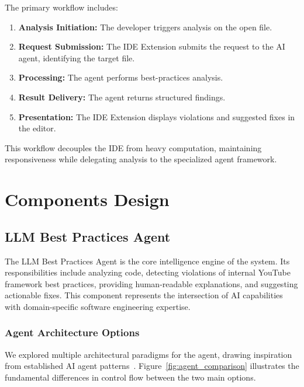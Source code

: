 \begin{spacing}{1.2}
The primary workflow includes:

\begin{enumerate}
    \item \textbf{Analysis Initiation:} The developer triggers analysis on the open file.
    \item \textbf{Request Submission:} The IDE Extension submits the request to the AI agent, identifying the target file.
    \item \textbf{Processing:} The agent performs best-practices analysis.
    \item \textbf{Result Delivery:} The agent returns structured findings.
    \item \textbf{Presentation:} The IDE Extension displays violations and suggested fixes in the editor.
\end{enumerate}

This workflow decouples the IDE from heavy computation, maintaining responsiveness while delegating analysis to the specialized agent framework.

\section{Components Design}

\subsection{LLM Best Practices Agent} 
The LLM Best Practices Agent is the core intelligence engine of the system. Its responsibilities include analyzing code, detecting violations of internal YouTube framework best practices, providing human-readable explanations, and suggesting actionable fixes. This component represents the intersection of AI capabilities with domain-specific software engineering expertise.

\subsubsection{Agent Architecture Options}
We explored multiple architectural paradigms for the agent, drawing inspiration from established AI agent patterns~\cite{microsoftAgentPatterns}. Figure~\ref{fig:agent_comparison} illustrates the fundamental differences in control flow between the two main options.


\end{spacing}
